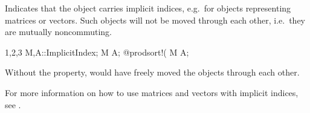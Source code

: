 
Indicates that the object carries
  implicit indices, e.g.~for objects representing matrices or
  vectors. Such objects will not be moved through each other,
  i.e.~they are mutually noncommuting. 
\begin{screen}{1,2,3}
{M,A}::ImplicitIndex;
M A;
@prodsort!(%
M A;
\end{screen}
Without the  property, 
would have freely moved the objects through each other.

For more information on how to use matrices and vectors with implicit
indices, see .

